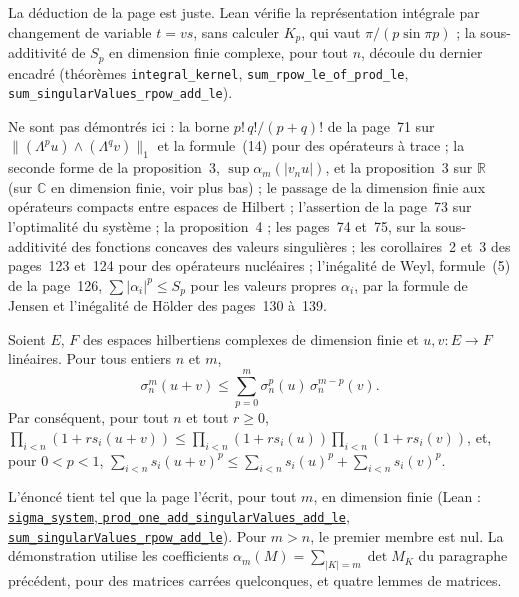 \noindent La déduction de la page est juste. Lean vérifie la représentation intégrale par changement de variable $t = vs$, sans calculer $K_p$, qui vaut $\pi/(p \sin \pi p)$ ; la sous-additivité de $S_p$ en dimension finie complexe, pour tout $n$, découle du dernier encadré (théorèmes \texttt{integral\_kernel}, \texttt{sum\_rpow\_le\_of\_prod\_le}, \texttt{sum\_singularValues\_rpow\_add\_le}).

Ne sont pas démontrés ici : la borne $p!\,q!/(p+q)!$ de la page~71 sur $\|(\Lambda^p u) \wedge (\Lambda^q v)\|_1$ et la formule~(14) pour des opérateurs à trace ; la seconde forme de la proposition~3, $\sup \alpha_m(|v_n u|)$, et la proposition~3 sur $\mathbb R$ (sur $\mathbb C$ en dimension finie, voir plus bas) ; le passage de la dimension finie aux opérateurs compacts entre espaces de Hilbert ; l'assertion de la page~73 sur l'optimalité du système ; la proposition~4 ; les pages~74 et~75, sur la sous-additivité des fonctions concaves des valeurs singulières ; les corollaires~2 et~3 des pages~123 et~124 pour des opérateurs nucléaires ; l'inégalité de Weyl, formule~(5) de la page~126, $\sum |\alpha_i|^p \leq S_p$ pour les valeurs propres $\alpha_i$, par la formule de Jensen et l'inégalité de Hölder des pages~130 à~139.

\begin{encadre}
\begin{theoreme}
Soient $E$, $F$ des espaces hilbertiens complexes de dimension finie et $u, v : E \to F$ linéaires. Pour tous entiers $n$ et $m$,
\[
  \sigma_n^m(u+v) \leq \sum_{p=0}^{m} \sigma_n^p(u)\,\sigma_n^{m-p}(v).
\]
Par conséquent, pour tout $n$ et tout $r \geq 0$, $\prod_{i<n}(1 + r s_i(u+v)) \leq \prod_{i<n}(1 + r s_i(u)) \prod_{i<n}(1 + r s_i(v))$, et, pour $0 < p < 1$, $\sum_{i<n} s_i(u+v)^p \leq \sum_{i<n} s_i(u)^p + \sum_{i<n} s_i(v)^p$.
\end{theoreme}
\end{encadre}
L'énoncé tient tel que la page l'écrit, pour tout $m$, en dimension finie (Lean : \href{\leanblob/LinearAlgebra/Folder1.lean}{\texttt{sigma\_system}, \texttt{prod\_one\_add\_singularValues\_add\_le}, \texttt{sum\_singularValues\_rpow\_add\_le}}). Pour $m > n$, le premier membre est nul. La démonstration utilise les coefficients $\alpha_m(M) = \sum_{|K| = m} \det M_K$ du paragraphe précédent, pour des matrices carrées quelconques, et quatre lemmes de matrices.

